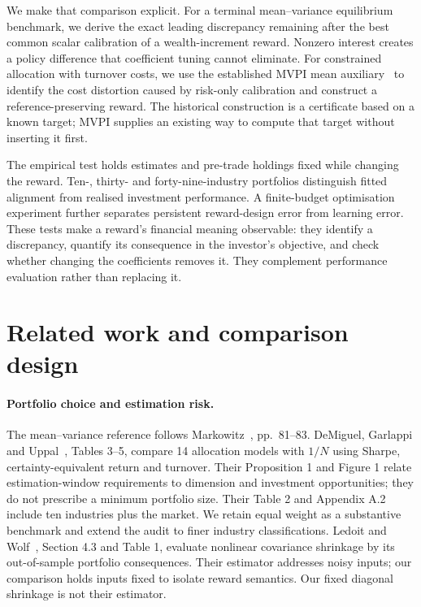\documentclass[sigconf,anonymous,review]{acmart}
\begin{document}
We make that comparison explicit. For a terminal mean--variance equilibrium benchmark, we derive the exact leading discrepancy remaining after the best common scalar calibration of a wealth-increment reward. Nonzero interest creates a policy difference that coefficient tuning cannot eliminate. For constrained allocation with turnover costs, we use the established MVPI mean auxiliary~\cite{zhang2021} to identify the cost distortion caused by risk-only calibration and construct a reference-preserving reward. The historical construction is a certificate based on a known target; MVPI supplies an existing way to compute that target without inserting it first.

The empirical test holds estimates and pre-trade holdings fixed while changing the reward. Ten-, thirty- and forty-nine-industry portfolios distinguish fitted alignment from realised investment performance. A finite-budget optimisation experiment further separates persistent reward-design error from learning error. These tests make a reward's financial meaning observable: they identify a discrepancy, quantify its consequence in the investor's objective, and check whether changing the coefficients removes it. They complement performance evaluation rather than replacing it.

\section{Related work and comparison design}
\paragraph{Portfolio choice and estimation risk.}
The mean--variance reference follows Markowitz~\cite{markowitz1952}, pp.\ 81--83. DeMiguel, Garlappi and Uppal~\cite{demiguel2009}, Tables 3--5, compare 14 allocation models with $1/N$ using Sharpe, certainty-equivalent return and turnover. Their Proposition 1 and Figure 1 relate estimation-window requirements to dimension and investment opportunities; they do not prescribe a minimum portfolio size. Their Table 2 and Appendix A.2 include ten industries plus the market. We retain equal weight as a substantive benchmark and extend the audit to finer industry classifications. Ledoit and Wolf~\cite{ledoit2017}, Section 4.3 and Table 1, evaluate nonlinear covariance shrinkage by its out-of-sample portfolio consequences. Their estimator addresses noisy inputs; our comparison holds inputs fixed to isolate reward semantics. Our fixed diagonal shrinkage is not their estimator.
\end{document}
